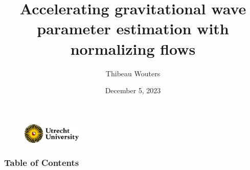 \documentclass[usenames,dvipsnames,t]{beamer}
\title[ML4GW] %
{Accelerating gravitational wave parameter estimation with normalizing flows}
\author{Thibeau Wouters}
\date{December 5, 2023}
\begin{document}
{


\begin{frame}[plain]
\titlepage

\begin{figure}
\centering
\includegraphics[width=0.25\textwidth]{Figures/utrecht-university.png}
\end{figure}

\end{frame}
}






\begin{frame}
\frametitle{Table of Contents}
\tableofcontents
\end{frame}
\end{document}
